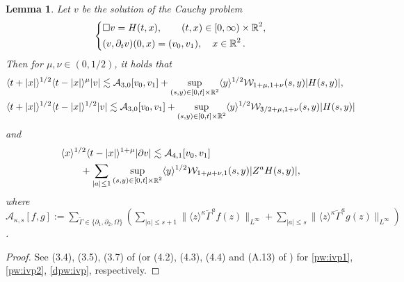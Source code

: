 \documentclass[11pt,twoside]{article}
\def\cA{\mathcal A}
\def\cW{\mathcal W}
\def\R{\mathop{\mathbb R\kern 0pt}\nolimits}
\def\ds{\displaystyle}
\def\p{\partial}
\def\ls{\lesssim}
\newcommand{\w}[1]{\langle {#1} \rangle}
\theoremstyle{plain}
\newtheorem{lemma}[theorem]{Lemma}
\theoremstyle{definition}
\numberwithin{equation}{section}
\begin{document}
\begin{lemma}
Let $v$ be the solution of the Cauchy problem
\begin{equation*}
\left\{
\begin{aligned}
&\Box v=H(t,x),\qquad(t,x)\in[0,\infty)\times\R^2,\\
&(v,\p_tv)(0,x)=(v_0,v_1),\quad x\in\R^2.
\end{aligned}
\right.
\end{equation*}
Then for $\mu,\nu\in(0,1/2)$, it holds that
\begin{align}
&\w{t+|x|}^{1/2}\w{t-|x|}^\mu|v|\ls\cA_{3,0}[v_0,v_1]+\sup_{(s,y)\in[0,t]\times\R^2}\w{y}^{1/2}\cW_{1+\mu,1+\nu}(s,y)|H(s,y)|,\label{pw:ivp1}\\
&\w{t+|x|}^{1/2}\w{t-|x|}^{1/2}|v|\ls\cA_{3,0}[v_0,v_1]+\sup_{(s,y)\in[0,t]\times\R^2}\w{y}^{1/2}\cW_{3/2+\mu,1+\nu}(s,y)|H(s,y)|\label{pw:ivp2}
\end{align}
and
\begin{equation}\label{dpw:ivp}
\begin{split}
&\w{x}^{1/2}\w{t-|x|}^{1+\mu}|\p v|\ls\cA_{4,1}[v_0,v_1]\\
&\qquad+\sum_{|a|\le1}\sup_{(s,y)\in[0,t]\times\R^2}\w{y}^{1/2}\cW_{1+\mu+\nu,1}(s,y)|Z^aH(s,y)|,
\end{split}
\end{equation}
where $\ds\cA_{\kappa,s}[f,g]:=\sum_{\tilde\Gamma\in\{\p_1,\p_2,\Omega\}}
(\sum_{|a|\le s+1}\|\w{z}^\kappa\tilde\Gamma^af(z)\|_{L^\infty}+\sum_{|a|\le s}\|\w{z}^\kappa\tilde\Gamma^ag(z)\|_{L^\infty})$.
\end{lemma}
\begin{proof}
See (3.4), (3.5), (3.7) of \cite{HouYinYuan24} (or (4.2), (4.3), (4.4) and (A.13) of \cite{Kubo19}) for \eqref{pw:ivp1}, \eqref{pw:ivp2}, \eqref{dpw:ivp}, respectively.
\end{proof}
\end{document}
